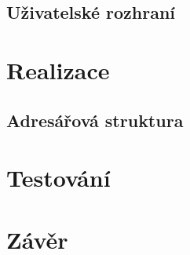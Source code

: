 \documentclass[czech,BP]{thesiskiv}
\begin{document}
	\section{Uživatelské rozhraní}
\chapter{Realizace}
	\section{Adresářová struktura}
\chapter{Testování}

\chapter{Závěr}


%
%
\lstlistoflistings

% 
%

{\raggedright\small

}
\end{document}
